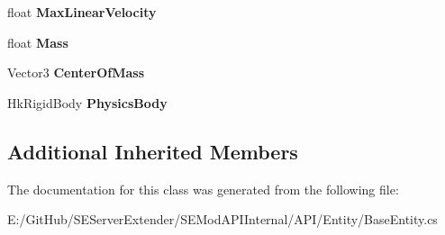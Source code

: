 \begin{DoxyCompactItemize}
\item 
\hypertarget{class_s_e_mod_a_p_i_internal_1_1_a_p_i_1_1_entity_1_1_base_entity_a44ceb24f0f182d574e9ecd569e56bb93}{}float {\bfseries Max\+Linear\+Velocity}\label{class_s_e_mod_a_p_i_internal_1_1_a_p_i_1_1_entity_1_1_base_entity_a44ceb24f0f182d574e9ecd569e56bb93}

\item 
\hypertarget{class_s_e_mod_a_p_i_internal_1_1_a_p_i_1_1_entity_1_1_base_entity_a7436df5609c0d97c7fa788d56efbf789}{}float {\bfseries Mass}\label{class_s_e_mod_a_p_i_internal_1_1_a_p_i_1_1_entity_1_1_base_entity_a7436df5609c0d97c7fa788d56efbf789}

\item 
\hypertarget{class_s_e_mod_a_p_i_internal_1_1_a_p_i_1_1_entity_1_1_base_entity_a827dde7205287271dc0c06aa80a62f7f}{}Vector3 {\bfseries Center\+Of\+Mass}\label{class_s_e_mod_a_p_i_internal_1_1_a_p_i_1_1_entity_1_1_base_entity_a827dde7205287271dc0c06aa80a62f7f}

\item 
\hypertarget{class_s_e_mod_a_p_i_internal_1_1_a_p_i_1_1_entity_1_1_base_entity_adb1aeb6ed8a18e9075ada7ff54dd1f9c}{}Hk\+Rigid\+Body {\bfseries Physics\+Body}\label{class_s_e_mod_a_p_i_internal_1_1_a_p_i_1_1_entity_1_1_base_entity_adb1aeb6ed8a18e9075ada7ff54dd1f9c}

\end{DoxyCompactItemize}
\subsection*{Additional Inherited Members}


The documentation for this class was generated from the following file\+:\begin{DoxyCompactItemize}
\item 
E\+:/\+Git\+Hub/\+S\+E\+Server\+Extender/\+S\+E\+Mod\+A\+P\+I\+Internal/\+A\+P\+I/\+Entity/Base\+Entity.\+cs\end{DoxyCompactItemize}
